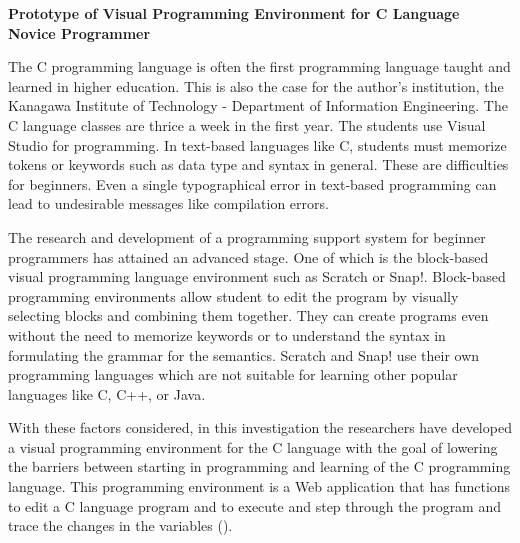 \flushleft
\textbf{Prototype of Visual Programming Environment for C Language Novice
Programmer}\\
\justifying

\parx
The C programming language is often the first programming language taught and
learned in higher education. This is also the case for the author's institution,
the Kanagawa Institute of Technology - Department of Information Engineering.
The C language classes are thrice a week in the first year. The students use
Visual Studio for programming. In text-based languages like C, students must
memorize tokens or keywords such as data type and syntax in general. These are
difficulties for beginners. Even a single typographical error in text-based
programming can lead to undesirable messages like compilation errors.

\parx
The research and development of a programming support system for beginner
programmers has attained an advanced stage. One of which is the block-based
visual programming language environment such as Scratch or Snap!. Block-based
programming environments allow student to edit the program by visually selecting
blocks and combining them together. They can create programs even without the
need to memorize keywords or to understand the syntax in formulating the grammar
for the semantics. Scratch and Snap! use their own programming languages which
are not suitable for learning other popular languages like C, C++, or Java.

\parx
With these factors considered, in this investigation the researchers have
developed a visual programming environment for the C language with the goal of
lowering the barriers between starting in programming and learning of the C
programming language. This programming environment is a Web application that has
functions to edit a C language program and to execute and step through the
program and trace the changes in the variables (\cite{abe_fukawa_tanaka_2019}).

